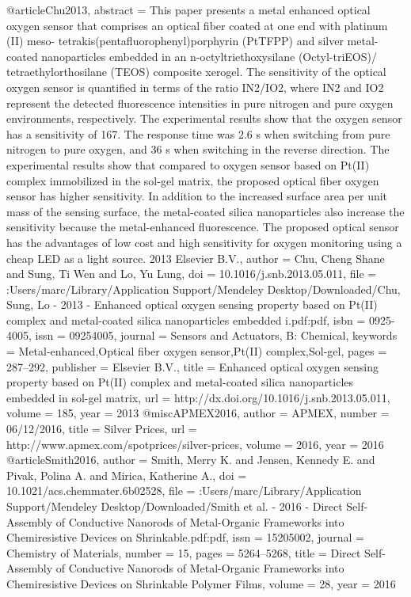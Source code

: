 @article{Chu2013,
abstract = {This paper presents a metal enhanced optical oxygen sensor that comprises an optical fiber coated at one end with platinum (II) meso- tetrakis(pentafluorophenyl)porphyrin (PtTFPP) and silver metal-coated nanoparticles embedded in an n-octyltriethoxysilane (Octyl-triEOS)/ tetraethylorthosilane (TEOS) composite xerogel. The sensitivity of the optical oxygen sensor is quantified in terms of the ratio IN2/IO2, where IN2 and IO2 represent the detected fluorescence intensities in pure nitrogen and pure oxygen environments, respectively. The experimental results show that the oxygen sensor has a sensitivity of 167. The response time was 2.6 s when switching from pure nitrogen to pure oxygen, and 36 s when switching in the reverse direction. The experimental results show that compared to oxygen sensor based on Pt(II) complex immobilized in the sol-gel matrix, the proposed optical fiber oxygen sensor has higher sensitivity. In addition to the increased surface area per unit mass of the sensing surface, the metal-coated silica nanoparticles also increase the sensitivity because the metal-enhanced fluorescence. The proposed optical sensor has the advantages of low cost and high sensitivity for oxygen monitoring using a cheap LED as a light source. {\textcopyright} 2013 Elsevier B.V.},
author = {Chu, Cheng Shane and Sung, Ti Wen and Lo, Yu Lung},
doi = {10.1016/j.snb.2013.05.011},
file = {:Users/marc/Library/Application Support/Mendeley Desktop/Downloaded/Chu, Sung, Lo - 2013 - Enhanced optical oxygen sensing property based on Pt(II) complex and metal-coated silica nanoparticles embedded i.pdf:pdf},
isbn = {0925-4005},
issn = {09254005},
journal = {Sensors and Actuators, B: Chemical},
keywords = {Metal-enhanced,Optical fiber oxygen sensor,Pt(II) complex,Sol-gel},
pages = {287--292},
publisher = {Elsevier B.V.},
title = {{Enhanced optical oxygen sensing property based on Pt(II) complex and metal-coated silica nanoparticles embedded in sol-gel matrix}},
url = {http://dx.doi.org/10.1016/j.snb.2013.05.011},
volume = {185},
year = {2013}
}
@misc{APMEX2016,
author = {APMEX},
number = {06/12/2016},
title = {{Silver Prices}},
url = {http://www.apmex.com/spotprices/silver-prices},
volume = {2016},
year = {2016}
}
@article{Smith2016,
author = {Smith, Merry K. and Jensen, Kennedy E. and Pivak, Polina A. and Mirica, Katherine A.},
doi = {10.1021/acs.chemmater.6b02528},
file = {:Users/marc/Library/Application Support/Mendeley Desktop/Downloaded/Smith et al. - 2016 - Direct Self-Assembly of Conductive Nanorods of Metal-Organic Frameworks into Chemiresistive Devices on Shrinkable.pdf:pdf},
issn = {15205002},
journal = {Chemistry of Materials},
number = {15},
pages = {5264--5268},
title = {{Direct Self-Assembly of Conductive Nanorods of Metal-Organic Frameworks into Chemiresistive Devices on Shrinkable Polymer Films}},
volume = {28},
year = {2016}
}
